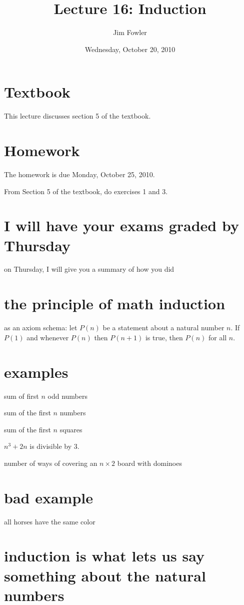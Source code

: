 \documentclass[12pt]{handout}
\title{Lecture 16: Induction}
\author{Jim Fowler}
\date{Wednesday, October 20, 2010}
\begin{document}
\maketitle

\section*{Textbook}

This lecture discusses section 5 of the textbook.

\section*{Homework} 

The homework is due Monday, October 25, 2010.

From Section 5 of the textbook, do exercises 1 and 3.

\section*{I will have your exams graded by Thursday}

on Thursday, I will give you a summary of how you did

\section*{the principle of math induction}

as an axiom schema: let $P(n)$ be a statement about a natural number $n$.  If $P(1)$ and whenever $P(n)$ then $P(n+1)$ is true, then $P(n)$ for all $n$.

\section*{examples}

sum of first $n$ odd numbers

sum of the first $n$ numbers

sum of the first $n$ squares

$n^3 + 2n$ is divisible by 3.

number of ways of covering an $n \times 2$ board with dominoes


\section*{bad example}

all horses have the same color

\section*{induction is what lets us say something about the natural numbers}
\end{document}
